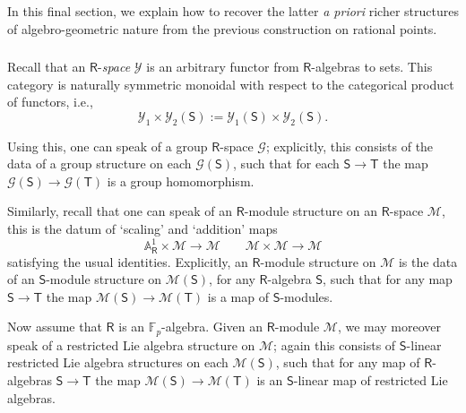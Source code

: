 \documentclass{amsart}
\theoremstyle{definition}
\newcommand{\sY}{\mathscr{Y}}
\newcommand{\lmod}{\on{-mod}}
\newcommand{\Pro}{\on{Pro}}
\newcommand{\sss}{\subsubsection{}}
\newcommand{\Sing}{\mathsf{S}}
\newcommand{\Ting}{\mathsf{T}}
\newcommand{\sM}{\mathscr{M}}
\newcommand{\on}{\mathrm}
\newcommand{\Ring}{\mathsf{R}}
\newcommand{\F}{\mathbb{F}}
\numberwithin{equation}{section}
\begin{document}
In this final section, we explain how to recover the latter {\em a priori} richer structures of algebro-geometric nature from the previous construction on rational points. 

\sss\label{SSS_spaces} 
Recall that an $\Ring$-{\em space} $\sY$ is an arbitrary functor from $\Ring$-algebras to sets. This category is naturally symmetric monoidal with respect to the categorical product of functors, i.e., $$\sY_1 \times \sY_2 (\Sing) := \sY_1(\Sing) \times \sY_2(\Sing).$$

Using this, one can speak of a group $\Ring$-space $\mathscr{G}$; explicitly, this consists of the data of a group structure on each $\mathscr{G}(\Sing)$, such that for each $\Sing \rightarrow \Ting$ the map $\mathscr{G}(\Sing) \rightarrow \mathscr{G}(\Ting)$ is a group homomorphism. 



Similarly, recall that one can speak of an $\Ring$-module structure on an $\Ring$-space $\sM$, this is the datum of `scaling' and `addition' maps 
$$\mathbb{A}^1_\Ring \times \sM \rightarrow \sM \quad \quad \sM \times \sM \rightarrow \sM$$
satisfying the usual identities. Explicitly, an $\Ring$-module structure on $\sM$ is the data of an $\Sing$-module structure on $\sM(\Sing)$, for any $\Ring$-algebra $\Sing$, such that for any map $\Sing \rightarrow \Ting$ the map $\sM(\Sing) \rightarrow \sM(\Ting)$ is a map of $\Sing$-modules. 

Now assume that $\Ring$ is an $\F_p$-algebra. Given an $\Ring$-module $\sM$, we may moreover speak of a restricted Lie algebra structure on $\sM$; again this consists of $\Sing$-linear restricted Lie algebra structures on each $\sM(\Sing)$, such that for any map of $\Ring$-algebras $\Sing \rightarrow \Ting$ the map $\sM(\Sing) \rightarrow \sM(\Ting)$ is an $\Sing$-linear map of restricted Lie algebras.  
\end{document}
